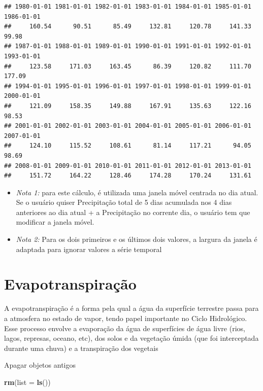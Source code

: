 \documentclass[
]{book}
\newenvironment{Shaded}{\begin{snugshade}}{\end{snugshade}}
\newcommand{\DataTypeTok}[1]{\textcolor[rgb]{0.13,0.29,0.53}{#1}}
\newcommand{\KeywordTok}[1]{\textcolor[rgb]{0.13,0.29,0.53}{\textbf{#1}}}
\newcommand{\NormalTok}[1]{#1}
\begin{document}
\begin{verbatim}
## 1980-01-01 1981-01-01 1982-01-01 1983-01-01 1984-01-01 1985-01-01 1986-01-01 
##     160.54      90.51      85.49     132.81     120.78     141.33      99.98 
## 1987-01-01 1988-01-01 1989-01-01 1990-01-01 1991-01-01 1992-01-01 1993-01-01 
##     123.58     171.03     163.45      86.39     120.82     111.70     177.09 
## 1994-01-01 1995-01-01 1996-01-01 1997-01-01 1998-01-01 1999-01-01 2000-01-01 
##     121.09     158.35     149.88     167.91     135.63     122.16      98.53 
## 2001-01-01 2002-01-01 2003-01-01 2004-01-01 2005-01-01 2006-01-01 2007-01-01 
##     124.10     115.52     108.61      81.14     117.21      94.05      98.69 
## 2008-01-01 2009-01-01 2010-01-01 2011-01-01 2012-01-01 2013-01-01 
##     151.72     164.22     128.46     174.28     170.24     131.61
\end{verbatim}

\begin{itemize}
\item
  \emph{Nota 1:} para este cálculo, é utilizada uma janela móvel centrada no dia atual. Se o usuário quiser Precipitação total de 5 dias acumulada nos 4 dias anteriores ao dia atual + a Precipitação no corrente dia, o usuário tem que modificar a janela móvel.
\item
  \emph{Nota 2:} Para os dois primeiros e os últimos dois valores, a largura da janela é adaptada para ignorar valores a série temporal
\end{itemize}

\hypertarget{evapotranspirauxe7uxe3o}{%
\section{Evapotranspiração}\label{evapotranspirauxe7uxe3o}}

A evapotranspiração é a forma pela qual a água da superfície terrestre passa para a atmosfera no estado de vapor, tendo papel importante no Ciclo Hidrológico. Esse processo envolve a evaporação da água de superfícies de água livre (rios, lagos, represas, oceano, etc), dos solos e da vegetação úmida (que foi interceptada durante uma chuva) e a transpiração dos vegetais

Apagar objetos antigos

\begin{Shaded}
\begin{Highlighting}[]
 \KeywordTok{rm}\NormalTok{(}\DataTypeTok{list =} \KeywordTok{ls}\NormalTok{())}
\end{Highlighting}
\end{Shaded}
\end{document}
